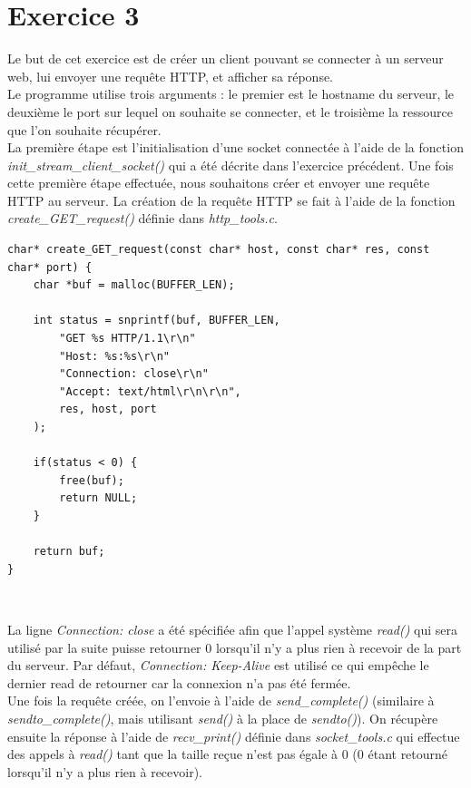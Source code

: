 \section{Exercice 3}
Le but de cet exercice est de créer un client pouvant se connecter à un serveur web, lui envoyer une requête HTTP, et afficher sa réponse.\\

Le programme utilise trois arguments : le premier est le hostname du serveur, le deuxième le port sur lequel on souhaite se connecter, et le troisième la ressource que l'on souhaite récupérer.\\

La première étape est l'initialisation d'une socket connectée à l'aide de la fonction \emph{init\_stream\_client\_socket()} qui a été décrite dans l'exercice précédent. Une fois cette première étape effectuée, nous souhaitons créer et envoyer une requête HTTP au serveur. La création de la requête HTTP se fait à l'aide de la fonction \emph{create\_GET\_request()} définie dans \emph{http\_tools.c}.\\

\begin{lstlisting}
char* create_GET_request(const char* host, const char* res, const char* port) {
    char *buf = malloc(BUFFER_LEN);

    int status = snprintf(buf, BUFFER_LEN,
        "GET %s HTTP/1.1\r\n"
        "Host: %s:%s\r\n"
        "Connection: close\r\n"
        "Accept: text/html\r\n\r\n",
        res, host, port
    );

    if(status < 0) {
        free(buf);
        return NULL;
    }

    return buf;
}
\end{lstlisting}
\

La ligne \emph{Connection: close} a été spécifiée afin que l'appel système \emph{read()} qui sera utilisé par la suite puisse retourner 0 lorsqu'il n'y a plus rien à recevoir de la part du serveur. Par défaut, \emph{Connection: Keep-Alive} est utilisé ce qui empêche le dernier read de retourner car la connexion n'a pas été fermée.\\

Une fois la requête créée, on l'envoie à l'aide de \emph{send\_complete()} (similaire à \emph{sendto\_complete()}, mais utilisant \emph{send()} à la place de \emph{sendto()}). On récupère ensuite la réponse à l'aide de \emph{recv\_print()} définie dans \emph{socket\_tools.c} qui effectue des appels à \emph{read()} tant que la taille reçue n'est pas égale à 0 (0 étant retourné lorsqu'il n'y a plus rien à recevoir).\\

